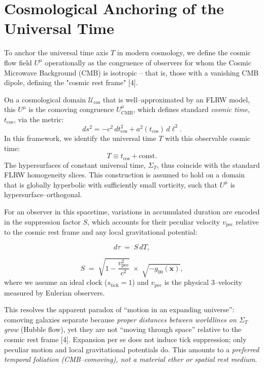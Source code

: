 \documentclass[12pt]{article}
\theoremstyle{plain}
\begin{document}
\section{Cosmological Anchoring of the Universal Time}
\label{sec:cosmological-anchoring}
To anchor the universal time axis $T$ in modern cosmology, we define the cosmic flow field $U^\mu$ operationally as the congruence of observers for whom the Cosmic Microwave Background (CMB) is isotropic – that is, those with a vanishing CMB dipole, defining the "cosmic rest frame" [4].

\medskip
\noindent
On a cosmological domain $\mathcal{U}_{\mathrm{cos}}$ that is well–approximated by an FLRW model, this $U^\mu$ is the comoving congruence $U^\mu_{\mathrm{CMB}}$, which defines standard \emph{cosmic time}, $t_{\mathrm{cos}}$, via the metric:
\[
ds^2 = -c^2\,dt_{\mathrm{cos}}^2 + a^2(t_{\mathrm{cos}})\,d\ell^2.
\]
In this framework, we identify the universal time $T$ with this observable cosmic time:
\[
T \equiv t_{\mathrm{cos}} + \text{const}.
\]
The hypersurfaces of constant universal time, $\Sigma_T$, thus coincide with the standard FLRW homogeneity slices. This construction is assumed to hold on a domain that is globally hyperbolic with sufficiently small vorticity, such that $U^\mu$ is hypersurface–orthogonal.

\medskip
\noindent
For an observer in this spacetime, variations in accumulated duration are encoded in the suppression factor $S$, which accounts for their peculiar velocity $v_{\text{pec}}$ relative to the cosmic rest frame and any local gravitational potential:

\begin{equation}
    d\tau \;=\; S\,dT,
    \label{eq:SuppressionGeneral}
\end{equation}

\[
    S \;=\; \sqrt{1-\frac{v_{\text{pec}}^2}{c^2}}\;\times\;\sqrt{-g_{00}(\mathbf{x})},
\]
where we assume an ideal clock ($s_{\text{tick}}=1$) and $v_{\text{pec}}$ is the physical 3–velocity measured by Eulerian observers.

\medskip
\noindent
This resolves the apparent paradox of “motion in an expanding universe”: comoving galaxies separate because \emph{proper distances between worldlines on $\Sigma_T$ grow} (Hubble flow), yet they are not “moving through space” relative to the cosmic rest frame [4]. Expansion per se does not induce tick suppression; only peculiar motion and local gravitational potentials do. This amounts to a \emph{preferred temporal foliation (CMB–comoving), not a material ether or spatial rest medium}.
\end{document}
